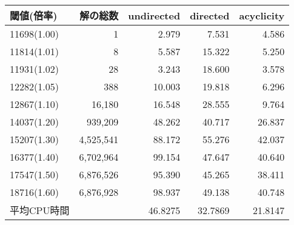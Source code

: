   \begin{tabular}{lr|rrr}
    閾値(倍率)    &	解の総数 & \textsf{undirected} & \textsf{directed} & \textsf{acyclicity} \\
    \hline
    11698(1.00)   &	1      &\alert{2.979} & 7.531 & 4.586	\\
    11814(1.01)   &	8      &5.587  & 15.322	& \alert{5.250}	\\
    11931(1.02)   &	28     &\alert{3.243}& 18.600	& 3.578	\\
    12282(1.05)   &	388    &10.003&19.818	& \alert{6.296}	\\
    12867(1.10)   &	16,180  &16.548& 28.555	& \alert{9.764}\\
    14037(1.20)   &	939,209 &48.262       &40.717	& \alert{26.837}\\
    15207(1.30)   &	4,525,541&88.172      &55.276	& \alert{42.037}\\
    16377(1.40)   &	6,702,964&99.154       &47.647	& \alert{40.640}	\\
    17547(1.50)   &	6,876,526&95.390       &45.265	& \alert{38.411}	\\
    18716(1.60)   &	6,876,928&98.937       &49.138	& \alert{40.748}	\\
    \hline
    平均CPU時間 &   & 46.8275 & 32.7869  & \alert{21.8147}\\
  \end{tabular}
